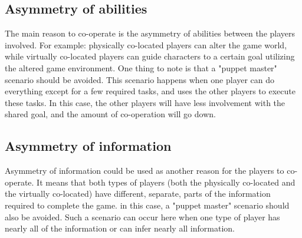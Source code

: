 		\subsection{Asymmetry of abilities}
			The main reason to co-operate is the asymmetry of abilities between
			the players involved. For example: physically co-located players can
			alter the game world, while virtually co-located players can guide
			characters to a certain goal utilizing the altered game environment.
			One thing to note is that a "puppet master" scenario should be avoided.
			This scenario happens when one player can do everything except for a
			few required tasks, and uses the other players to execute these tasks.
			In this case, the other players will have less involvement with the
			shared goal, and the amount of co-operation will go down.
		\subsection{Asymmetry of information}
			Asymmetry of information could be used as another reason for the players
			to co-operate. It means that both types of players (both the physically
			co-located and the virtually co-located) have different, separate, parts
			of the information required to complete the game. in this case, a
			"puppet master" scenario should also be avoided. Such a scenario can occur
			here when one type of player has nearly all of the information or can
			infer nearly all information.

	
	
